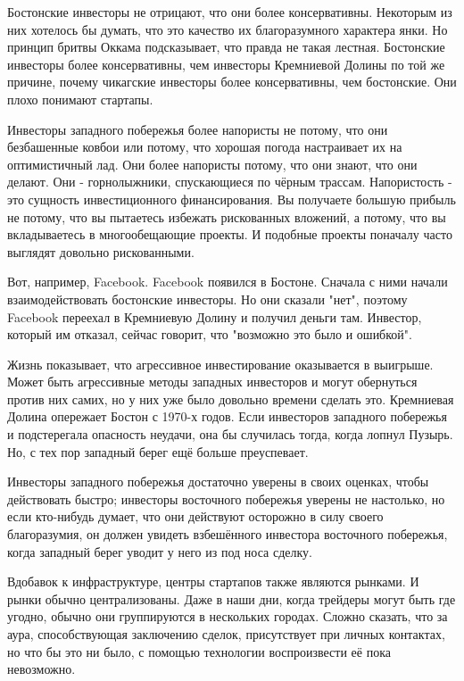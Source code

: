 \documentclass[ebook,12pt,oneside,openany]{memoir}
\begin{document}
Бостонские инвесторы не отрицают, что они более консервативны.
Некоторым из них хотелось бы думать, что это качество их
благоразумного характера янки. Но принцип бритвы Оккама подсказывает,
что правда не такая лестная. Бостонские инвесторы более консервативны,
чем инвесторы Кремниевой Долины по той же причине, почему чикагские
инвесторы более консервативны, чем бостонские. Они плохо понимают
стартапы.

Инвесторы западного побережья более напористы не потому, что они
безбашенные ковбои или потому, что хорошая погода настраивает их на
оптимистичный лад. Они более напористы потому, что они знают, что они
делают. Они - горнолыжники, спускающиеся по чёрным трассам.
Напористость - это сущность инвестиционного финансирования. Вы
получаете большую прибыль не потому, что вы пытаетесь избежать
рискованных вложений, а потому, что вы вкладываетесь в многообещающие
проекты. И подобные проекты поначалу часто выглядят довольно
рискованными.

Вот, например, Facebook. Facebook появился в Бостоне. Сначала с ними
начали взаимодействовать бостонские инвесторы. Но они сказали "нет",
поэтому Facebook переехал в Кремниевую Долину и получил деньги там.
Инвестор, который им отказал, сейчас говорит, что "возможно это было и
ошибкой".

Жизнь показывает, что агрессивное инвестирование оказывается в
выигрыше. Может быть агрессивные методы западных инвесторов и могут
обернуться против них самих, но у них уже было довольно времени
сделать это. Кремниевая Долина опережает Бостон с 1970-х годов. Если
инвесторов западного побережья и подстерегала опасность неудачи, она
бы случилась тогда, когда лопнул Пузырь. Но, с тех пор западный берег
ещё больше преуспевает.

Инвесторы западного побережья достаточно уверены в своих оценках,
чтобы действовать быстро; инвесторы восточного побережья уверены не
настолько, но если кто-нибудь думает, что они действуют осторожно в
силу своего благоразумия, он должен увидеть взбешённого инвестора
восточного побережья, когда западный берег уводит у него из под носа
сделку.

Вдобавок к инфраструктуре, центры стартапов также являются рынками. И
рынки обычно централизованы. Даже в наши дни, когда трейдеры могут
быть где угодно, обычно они группируются в нескольких городах. Сложно
сказать, что за аура, способствующая заключению сделок, присутствует
при личных контактах, но что бы это ни было, с помощью технологии
воспроизвести её пока невозможно.
\end{document}
